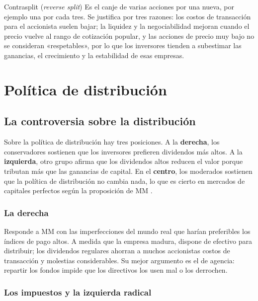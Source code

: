 \begin{definicion}{Contrasplit (\emph{reverse split})}
Es el canje de varias acciones por una nueva, por ejemplo una por cada tres. Se justifica por tres razones: los costos de transacción para el accionista suelen bajar; la liquidez y la negociabilidad mejoran cuando el precio vuelve al rango de cotización popular, y las acciones de precio muy bajo no se consideran «respetables», por lo que los inversores tienden a subestimar las ganancias, el crecimiento y la estabilidad de esas empresas.
\end{definicion}

\section{Política de distribución}\label{sec:u4-distribucion}

\subsection{La controversia sobre la distribución}

Sobre la política de distribución hay tres posiciones. A la \textbf{derecha}, los conservadores sostienen que los inversores prefieren dividendos más altos. A la \textbf{izquierda}, otro grupo afirma que los dividendos altos reducen el valor porque tributan más que las ganancias de capital. En el \textbf{centro}, los moderados sostienen que la política de distribución no cambia nada, lo que es cierto en mercados de capitales perfectos según la proposición de MM .

\subsubsection{La derecha}

Responde a MM con las imperfecciones del mundo real que harían preferibles los índices de pago altos. A medida que la empresa madura, dispone de efectivo para distribuir; los dividendos regulares ahorran a muchos accionistas costos de transacción y molestias considerables. Su mejor argumento es el de agencia: repartir los fondos impide que los directivos los usen mal o los derrochen.

\subsubsection{Los impuestos y la izquierda radical}

